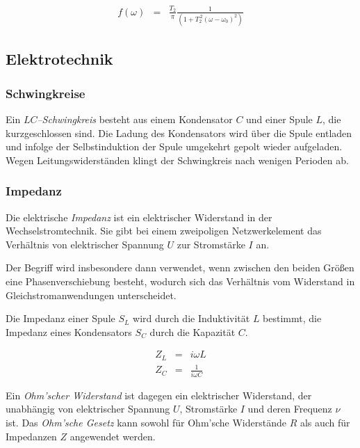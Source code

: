 \documentclass[12pt,a4paper]{scrartcl}
\numberwithin{equation}{section} %
\begin{document}
\begin{eqnarray}
	f(\omega) &=& \frac{T_2}{\pi}\frac{1}{(1+T_2^{\,2} (\omega - \omega _0)^2)}
\end{eqnarray}

\hypertarget{elektrotechnik}{%
\subsection{Elektrotechnik}\label{elektrotechnik}}

\hypertarget{schwingkreise}{%
\subsubsection{Schwingkreise}\label{schwingkreise}}

Ein \emph{$LC$--Schwingkreis} besteht aus einem Kondensator $C$ und einer Spule $L$, die kurzgeschlossen sind. Die Ladung des Kondensators wird über die Spule entladen und infolge der Selbstinduktion der Spule umgekehrt gepolt wieder aufgeladen. Wegen Leitungswiderständen klingt der Schwingkreis nach wenigen Perioden ab.

\hypertarget{impedanz}{%
\subsubsection{Impedanz}\label{impedanz}}

Die elektrische \emph{Impedanz} ist ein elektrischer Widerstand in der Wechselstromtechnik. Sie gibt bei einem zweipoligen Netzwerkelement das Verhältnis von elektrischer Spannung $U$ zur Stromstärke $I$ an.

Der Begriff wird insbesondere dann verwendet, wenn zwischen den beiden Größen eine Phasenverschiebung besteht, wodurch sich das Verhältnis vom Widerstand in Gleichstromanwendungen unterscheidet.

Die Impedanz einer Spule $S_L$ wird durch die Induktivität $L$ bestimmt, die Impedanz eines Kondensators $S_C$ durch die Kapazität $C$.

\begin{eqnarray}
    Z_L &=& i\omega L \\
    Z_C &=& \frac{1}{i\omega C}
\end{eqnarray}

\noindent
Ein \emph{Ohm'scher Widerstand} ist dagegen ein elektrischer Widerstand, der unabhängig von elektrischer Spannung $U$, Stromstärke $I$ und deren Frequenz $\nu$ ist. Das \emph{Ohm'sche Gesetz} kann sowohl für Ohm'sche Widerstände $R$ als auch für Impedanzen $Z$ angewendet werden.
\end{document}
